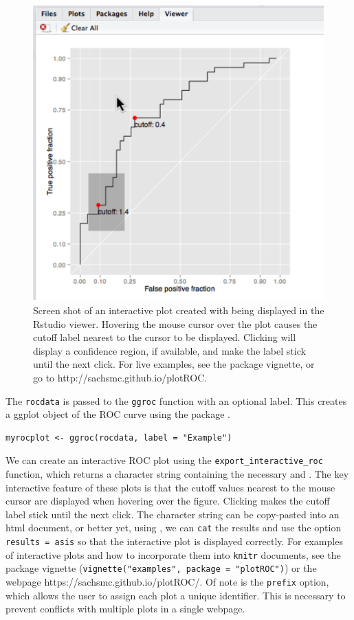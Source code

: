 \documentclass[article]{jss}
\begin{document}
\begin{figure}[ht]
\centering
\includegraphics{screen-shot.pdf}
\caption{Screen shot of an interactive plot created with  being displayed in the Rstudio viewer. Hovering the mouse cursor over the plot causes the cutoff label nearest to the cursor to be displayed. Clicking will display a confidence region, if available, and make the label stick until the next click. For live examples, see the package vignette, or go to http://sachsmc.github.io/plotROC. \label{interact}}
\end{figure}

The \texttt{rocdata} is passed to the \texttt{ggroc} function with an
optional label. This creates a ggplot object of the ROC curve using the
 package \citep{ggplot2}.

\begin{verbatim}
myrocplot <- ggroc(rocdata, label = "Example")
\end{verbatim}

We can create an interactive ROC plot using the
\texttt{export\_interactive\_roc} function, which returns a character
string containing the necessary  and
. The key interactive feature of these plots is
that the cutoff values nearest to the mouse cursor are displayed when
hovering over the figure. Clicking makes the cutoff label stick until
the next click. The character string can be copy-pasted into an html
document, or better yet, using  \citep{knitr}, we can
\texttt{cat} the results and use the option
\texttt{results = \textquotesingle{}asis\textquotesingle{}} so that the
interactive plot is displayed correctly. For examples of interactive
plots and how to incorporate them into \texttt{knitr} documents, see the
package vignette (\texttt{vignette("examples", package = "plotROC")}) or
the webpage https://sachsmc.github.io/plotROC/. Of note is the
\texttt{prefix} option, which allows the user to assign each plot a
unique identifier. This is necessary to prevent conflicts with multiple
plots in a single webpage.
\end{document}
